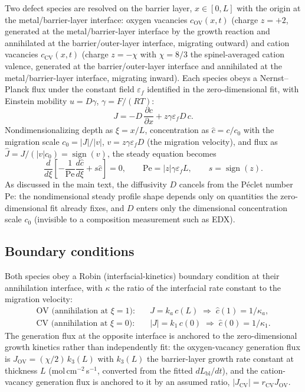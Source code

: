 Two defect species are resolved on the barrier layer, $x \in [0, L]$ with
the origin at the metal/barrier-layer interface: oxygen vacancies
$c_\text{OV}(x,t)$ (charge $z = +2$, generated at the metal/barrier-layer
interface by the growth reaction and annihilated at the
barrier/outer-layer interface, migrating outward) and cation vacancies
$c_\text{CV}(x,t)$ (charge $z = -\chi$ with $\chi = 8/3$ the
spinel-averaged cation valence, generated at the barrier/outer-layer
interface and annihilated at the metal/barrier-layer interface, migrating
inward). Each species obeys a Nernst--Planck flux under the constant
field $\varepsilon_f$ identified in the zero-dimensional fit, with
Einstein mobility $u = D\gamma$, $\gamma = F/(RT)$:
\begin{equation}
J = -D\,\frac{\partial c}{\partial x} + z\gamma\varepsilon_f D\,c.
\label{eq:nernstplanck}
\end{equation}
Nondimensionalizing depth as $\xi = x/L$, concentration as
$\hat{c} = c/c_0$ with the migration scale
$c_0 = |J|/|v|$, $v = z\gamma\varepsilon_f D$ (the migration velocity),
and flux as $\hat{J} = J/(|v|c_0) = \operatorname{sign}(v)$, the steady
equation becomes
\begin{equation}
\frac{d}{d\xi}\!\left[-\frac{1}{\mathrm{Pe}}\frac{d\hat{c}}{d\xi} + s\hat{c}\right] = 0,
\qquad
\mathrm{Pe} = |z|\gamma\varepsilon_f L, \qquad s = \operatorname{sign}(z).
\label{eq:steadypde}
\end{equation}
As discussed in the main text, the diffusivity $D$ cancels from the
P\'eclet number $\mathrm{Pe}$: the nondimensional steady profile shape
depends only on quantities the zero-dimensional fit already fixes, and
$D$ enters only the dimensional concentration scale $c_0$ (invisible to
a composition measurement such as EDX).

\subsection{Boundary conditions}

Both species obey a Robin (interfacial-kinetics) boundary condition at
their annihilation interface, with $\kappa$ the ratio of the interfacial
rate constant to the migration velocity:
\begin{align}
\text{OV (annihilation at } \xi=1\text{):}\quad & J = k_a\,c(L) \;\Longrightarrow\; \hat{c}(1) = 1/\kappa_a,
\label{eq:bc-ov}\\
\text{CV (annihilation at } \xi=0\text{):}\quad & |J| = k_1\,c(0) \;\Longrightarrow\; \hat{c}(0) = 1/\kappa_1.
\label{eq:bc-cv}
\end{align}
The generation flux at the opposite interface is anchored to the
zero-dimensional growth kinetics rather than independently fit: the
oxygen-vacancy generation flux is $J_\text{OV} = (\chi/2)\,k_3(L)$ with
$k_3(L)$ the barrier-layer growth rate constant at thickness $L$
(mol\,cm$^{-2}$\,s$^{-1}$, converted from the fitted $dL_\mathrm{bl}/dt$),
and the cation-vacancy generation flux is anchored to it by an assumed
ratio, $|J_\text{CV}| = r_\text{CV} J_\text{OV}$.

